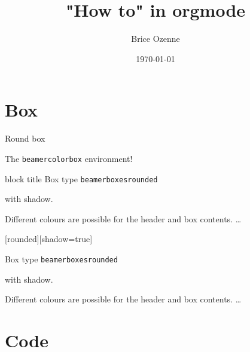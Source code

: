 \documentclass[table]{beamer}
\subtitle{}
\author{Brice Ozenne}
\date{\today}
\title{"How to" in orgmode}
\begin{document}
\maketitle

\section{Box}
\label{sec:org763e58f}

\begin{frame}[label={sec:org5ce5edf}]{Round box}

\begin{block}{}
	The \texttt{beamercolorbox} environment!
\end{block}

\begin{exampleblock}{block title}
	Box type \texttt{beamerboxesrounded}
	
	with shadow.
	
	Different colours are possible for the header and box contents. \ldots
\end{exampleblock}

[rounded][shadow=true]
\begin{example}
	Box type \texttt{beamerboxesrounded}
	
	with shadow.
	
	Different colours are possible for the header and box contents. \ldots
\end{example}
\end{frame}

\section{Code}
\label{sec:org6cb4fee}
\end{document}

